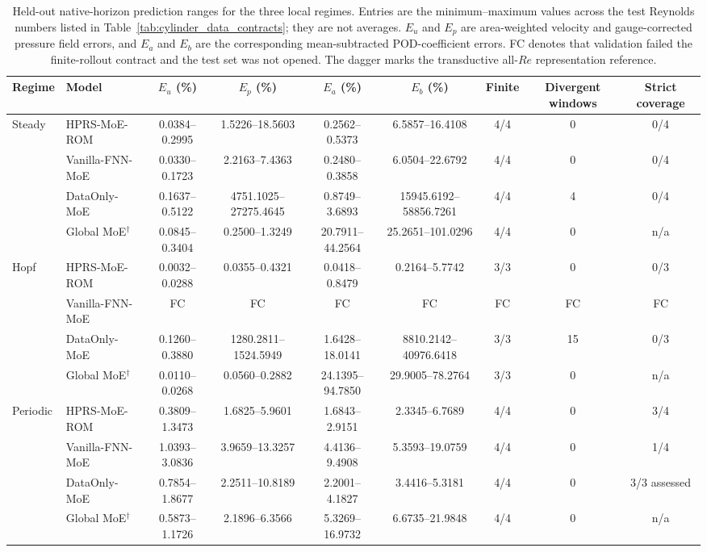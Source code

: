 \begin{table}[t]
\centering
\caption{Held-out native-horizon prediction ranges for the three local
regimes.  Entries are the minimum--maximum values across the test Reynolds
numbers listed in Table~\ref{tab:cylinder_data_contracts}; they are not
averages.  $E_u$ and $E_p$ are area-weighted velocity and gauge-corrected
pressure field errors, and $E_{a}$ and $E_{b}$ are the corresponding
mean-subtracted POD-coefficient errors.  FC denotes that validation failed the
finite-rollout contract and the test set was not opened.  The dagger marks the
transductive all-$Re$ representation reference.}
\label{tab:cylinder_specialist_long}
\scriptsize
\setlength{\tabcolsep}{3.2pt}
\begin{adjustbox}{max width=\textwidth}
\begin{tabular}{@{}llccccccc@{}}
\toprule
Regime & Model & $E_u$ (\%) & $E_p$ (\%) & $E_a$ (\%) & $E_b$ (\%) &
Finite & Divergent windows & Strict coverage \\
\midrule
Steady
& HPRS-MoE-ROM
& 0.0384--0.2995 & 1.5226--18.5603 & 0.2562--0.5373 & 6.5857--16.4108
& 4/4 & 0 & 0/4 \\
& Vanilla-FNN-MoE
& 0.0330--0.1723 & 2.2163--7.4363 & 0.2480--0.3858 & 6.0504--22.6792
& 4/4 & 0 & 0/4 \\
& DataOnly-MoE
& 0.1637--0.5122 & 4751.1025--27275.4645 & 0.8749--3.6893 &
15945.6192--58856.7261 & 4/4 & 4 & 0/4 \\
& Global MoE$^\dagger$
& 0.0845--0.3404 & 0.2500--1.3249 & 20.7911--44.2564 & 25.2651--101.0296
& 4/4 & 0 & n/a \\
\midrule
Hopf
& HPRS-MoE-ROM
& 0.0032--0.0288 & 0.0355--0.4321 & 0.0418--0.8479 & 0.2164--5.7742
& 3/3 & 0 & 0/3 \\
& Vanilla-FNN-MoE
& FC & FC & FC & FC & FC & FC & FC \\
& DataOnly-MoE
& 0.1260--0.3880 & 1280.2811--1524.5949 & 1.6428--18.0141 &
8810.2142--40976.6418 & 3/3 & 15 & 0/3 \\
& Global MoE$^\dagger$
& 0.0110--0.0268 & 0.0560--0.2882 & 24.1395--94.7850 & 29.9005--78.2764
& 3/3 & 0 & n/a \\
\midrule
Periodic
& HPRS-MoE-ROM
& 0.3809--1.3473 & 1.6825--5.9601 & 1.6843--2.9151 & 2.3345--6.7689
& 4/4 & 0 & 3/4 \\
& Vanilla-FNN-MoE
& 1.0393--3.0836 & 3.9659--13.3257 & 4.4136--9.4908 & 5.3593--19.0759
& 4/4 & 0 & 1/4 \\
& DataOnly-MoE
& 0.7854--1.8677 & 2.2511--10.8189 & 2.2001--4.1827 & 3.4416--5.3181
& 4/4 & 0 & 3/3 assessed \\
& Global MoE$^\dagger$
& 0.5873--1.1726 & 2.1896--6.3566 & 5.3269--16.9732 & 6.6735--21.9848
& 4/4 & 0 & n/a \\
\bottomrule
\end{tabular}
\end{adjustbox}
\end{table}

